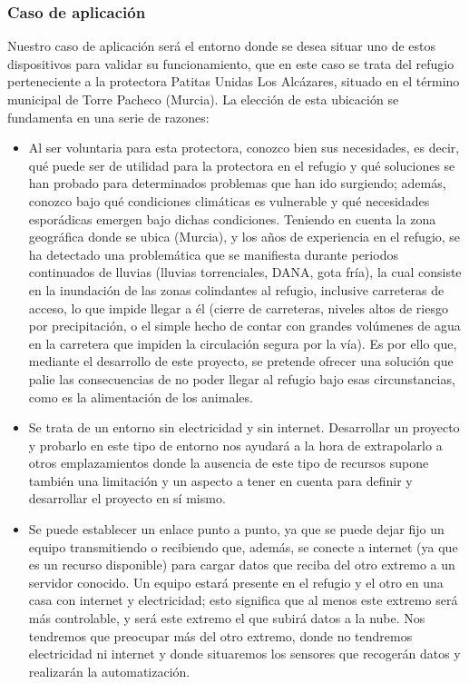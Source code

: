 \documentclass[12pt]{article}
\begin{document}
	
	\subsubsection[Caso de aplicación]{Caso de aplicación}
	
		Nuestro caso de aplicación será el entorno donde se desea situar uno de estos dispositivos para validar su funcionamiento, que en este caso se trata del refugio perteneciente a la protectora Patitas Unidas Los Alcázares, situado en el término municipal de Torre Pacheco (Murcia).
	La elección de esta ubicación se fundamenta en una serie de razones:
	
	\begin{itemize}
		\item Al ser voluntaria para esta protectora, conozco bien sus necesidades, es decir, qué puede ser de utilidad para la protectora en el refugio y qué soluciones se han probado para determinados problemas que han ido surgiendo; además, conozco bajo qué condiciones climáticas es vulnerable y qué necesidades esporádicas emergen bajo dichas condiciones. Teniendo en cuenta la zona geográfica donde se ubica (Murcia), y los años de experiencia en el refugio, se ha detectado una problemática que se manifiesta durante  periodos continuados de lluvias (lluvias torrenciales, DANA, gota fría), la cual consiste en la inundación de las zonas colindantes al refugio, inclusive carreteras de acceso, lo que impide llegar a él (cierre de carreteras, niveles altos de riesgo por precipitación, o el simple hecho de contar con grandes volúmenes de agua en la carretera que impiden la circulación segura por la vía). Es por ello que, mediante el desarrollo de este proyecto, se pretende ofrecer una solución que palie las consecuencias de no poder llegar al refugio bajo esas circunstancias, como es la alimentación de los animales.
		\item Se trata de un entorno sin electricidad y sin internet. Desarrollar un proyecto y probarlo en este tipo de entorno nos ayudará a la hora de extrapolarlo a otros emplazamientos donde la ausencia de este tipo de recursos supone también una limitación y un aspecto a tener en cuenta para definir y desarrollar el proyecto en sí mismo.
		\item Se puede establecer un enlace punto a punto, ya que se puede dejar fijo un equipo transmitiendo o recibiendo que, además, se conecte a internet (ya que es un recurso disponible) para cargar datos que reciba del otro extremo a un servidor conocido. Un equipo estará presente en el refugio y el otro en una casa con internet y electricidad; esto significa que al menos este extremo será más controlable, y será este extremo el que subirá datos a la nube. Nos tendremos que preocupar más del otro extremo, donde no tendremos electricidad ni internet y donde situaremos los sensores que recogerán datos y realizarán la automatización.
	\end{itemize}
	
\end{document}
